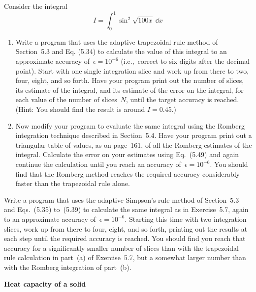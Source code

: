 \documentclass[12pt]{article}
\begin{document}
\begin{exercises}
\exercise Consider the integral
\begin{displaymath}
I = \int_0^1 \sin^2 \sqrt{100 x} \>\dd x
\end{displaymath}
\begin{enumerate}\setlength{\itemsep}{0pt}
\item Write a program that uses the adaptive trapezoidal rule method of
  Section~5.3 and Eq. (5.34) to calculate the value of this integral to an
  approximate accuracy of~$\epsilon=10^{-6}$ (i.e.,~correct to six digits
  after the decimal point).  Start with one single integration slice and
  work up from there to two, four, eight, and so forth.  Have your program
  print out the number of slices, its estimate of the integral, and its
  estimate of the error on the integral, for each value of the number of
  slices~$N$, until the target accuracy is reached.  (Hint: You should find
  the result is around $I=0.45$.)
\item Now modify your program to evaluate the same integral using the
  Romberg integration technique described in Section~5.4.  Have your
  program print out a triangular table of values, as on page~161, of all
  the Romberg estimates of the integral.  Calculate the error on your
  estimates using Eq.~(5.49) and again continue the calculation until you
  reach an accuracy of~$\epsilon=10^{-6}$.  You should find that the
  Romberg method reaches the required accuracy considerably faster than the
  trapezoidal rule alone.
\end{enumerate}



\exercise Write a program that uses the adaptive Simpson's rule method of
Section~5.3 and Eqs.~(5.35) to~(5.39) to calculate the same integral as in
Exercise~5.7, again to an approximate accuracy of~$\epsilon=10^{-6}$.
Starting this time with two integration slices, work up from there to four,
eight, and so forth, printing out the results at each step until the
required accuracy is reached.  You should find you reach that accuracy for
a significantly smaller number of slices than with the trapezoidal rule
calculation in part~(a) of Exercise~5.7, but a somewhat larger number than
with the Romberg integration of part~(b).



\exercise \textbf{Heat capacity of a solid}


\end{exercises}
\end{document}
